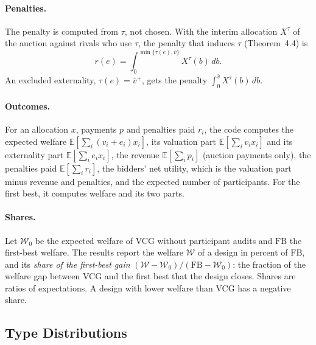 \documentclass[11pt]{article}
\newcommand{\W}{\mathcal{W}}
\newcommand{\FB}{\mathrm{FB}}
\newcommand{\vplus}{\bar v^{+}}
\begin{document}
\paragraph{Penalties.} The penalty is computed from $\tau$, not chosen. With the interim allocation $X^\tau$ of the auction against rivals who use $\tau$, the penalty that induces $\tau$ (Theorem~4.4) is
\[
r(e)=\int_0^{\min\{\tau(e),\bar v\}}X^\tau(b)\,db .
\]
An excluded externality, $\tau(e)=\vplus$, gets the penalty $\int_0^{\bar v}X^\tau(b)\,db$.

\paragraph{Outcomes.} For an allocation $x$, payments $p$ and penalties paid $r_i$, the code computes the expected welfare $\mathbb{E}[\sum_i(v_i+e_i)x_i]$, its valuation part $\mathbb{E}[\sum_iv_ix_i]$ and its externality part $\mathbb{E}[\sum_ie_ix_i]$, the revenue $\mathbb{E}[\sum_ip_i]$ (auction payments only), the penalties paid $\mathbb{E}[\sum_ir_i]$, the bidders' net utility, which is the valuation part minus revenue and penalties, and the expected number of participants. For the first best, it computes welfare and its two parts.

\paragraph{Shares.} Let $\W_0$ be the expected welfare of VCG without participant audits and $\FB$ the first-best welfare. The results report the welfare $\W$ of a design in percent of $\FB$, and its \emph{share of the first-best gain} $(\W-\W_0)/(\FB-\W_0)$: the fraction of the welfare gap between VCG and the first best that the design closes. Shares are ratios of expectations. A design with lower welfare than VCG has a negative share.

\subsection{Type Distributions}\label{sec:distributions}
\end{document}
